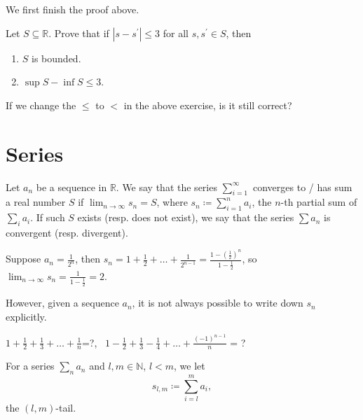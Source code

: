 We first finish the proof above.
\begin{exercise}
    Let \(S \subseteq \mathbb{R} \). Prove that if \(\left\vert s - s^{\prime}  \right\vert \le 3 \) for all \(s, s^{\prime} \in S\), then
    \begin{enumerate}
        \item \(S\) is bounded. 
        \item \(\sup S - \inf S \le 3\).  
    \end{enumerate}   
\end{exercise}

\begin{exercise}
    If we change the \(\le\) to \(<\) in the above exercise, is it still correct?  
\end{exercise}

\section{Series}
\begin{definition}
    Let \(a_n\) be a sequence in \(\mathbb{R} \). We say that the series \(\sum_{i=1}^{\infty}  \) converges to / has sum a real number \(S\) if \(\lim_{n \to \infty} s_n = S \), where \(s_n \coloneqq \sum_{i=1}^{n} a_i \), the \(n\)-th partial sum of \(\sum_{i}a_i \).     If such \(S\) exists (resp. does not exist), we say that the series \(\sum a_n \) is convergent (resp. divergent).  
\end{definition}

\begin{eg}
    Suppose \(a_n = \frac{1}{2^n}\), then \(s_n = 1 + \frac{1}{2} + \dots + \frac{1}{2^{n-1} }= \frac{1 - \left( \frac{1}{2} \right)^n }{1 - \frac{1}{2}}\), so \(\lim_{n \to \infty} s_n = \frac{1}{1 - \frac{1}{2}} = 2\).  
\end{eg}

\begin{note}
    However, given a sequence \(a_n\), it is not always possible to write down \(s_n\) explicitly. 
\end{note} 

\begin{eg}
    \(1 + \frac{1}{2} + \frac{1}{3} +\dots + \frac{1}{n}\)=?, \ \(1 - \frac{1}{2} + \frac{1}{3} - \frac{1}{4} + \dots + \frac{(-1)^{n-1} }{n}\) = ?  
\end{eg}

\begin{notation}
    For a series \(\sum_{n} a_n\) and \(l, m \in \mathbb{N} \), \(l < m\), we let
    \[
        s_{l,m} \coloneqq \sum_{i=l}^m a_i,
    \] the \((l,m)\)-tail. 
\end{notation}

